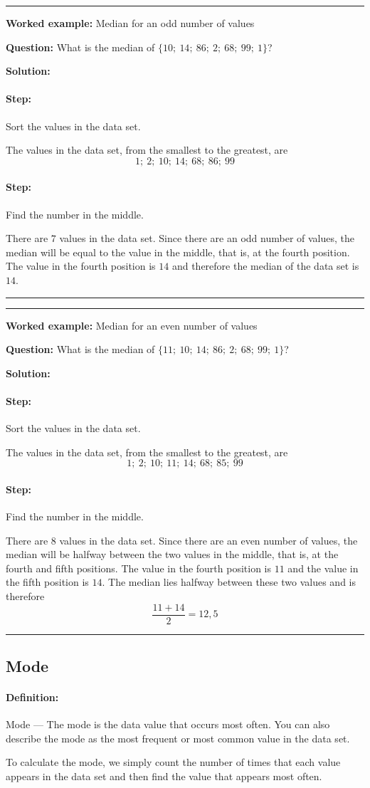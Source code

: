 \documentclass[a4paper,11pt]{report}
\def\Definition#1#2{\paragraph{Definition:} #1 --- #2}
\newenvironment{wex}[3]%
{\rule{\linewidth}{0.5mm}
\textbf{Worked example:} #1

\textbf{Question:} #2

\textbf{Solution:} #3}%
{\rule{\linewidth}{0.5mm}}
\newcommand{\westep}[1]{\paragraph{Step:} #1}
\begin{document}
\begin{wex}{Median for an odd number of values}{
  What is the median of $\{10;\ 14;\ 86;\ 2;\ 68;\ 99;\ 1\}$?
}{
  \westep{Sort the values in the data set.}

  The values in the data set, from the smallest to the greatest, are
  \begin{equation}
    1;\ 2;\ 10;\ 14;\ 68;\ 86;\ 99
  \end{equation}

  \westep{Find the number in the middle.}

  There are $7$ values in the data set. Since there are an odd number
  of values, the median will be equal to the value in the middle, that
  is, at the fourth position. The value in the fourth position is
  $14$ and therefore the median of the data set is $14$.
}
\end{wex}

\begin{wex}{Median for an even number of values}{
  What is the median of $\{11;\ 10;\ 14;\ 86;\ 2;\ 68;\ 99;\ 1\}$?
}{
  \westep{Sort the values in the data set.}

  The values in the data set, from the smallest to the greatest, are
  \begin{equation}
    1;\ 2;\ 10;\ 11;\ 14;\ 68;\ 85;\ 99
  \end{equation}

  \westep{Find the number in the middle.}

  There are $8$ values in the data set. Since there are an even number
  of values, the median will be halfway between the two values in the
  middle, that is, at the fourth and fifth positions. The value in the
  fourth position is $11$ and the value in the fifth position is
  $14$. The median lies halfway between these two values and is
  therefore
  \begin{equation}
    \frac{11+14}{2} = 12,5
  \end{equation}
}
\end{wex}

\subsection{Mode}
\Definition{Mode}{The mode is the data value that occurs most
  often. You can also describe the mode as the most frequent or most
  common value in the data set.}

To calculate the mode, we simply count the number of times that each
value appears in the data set and then find the value that appears
most often.
\end{document}
